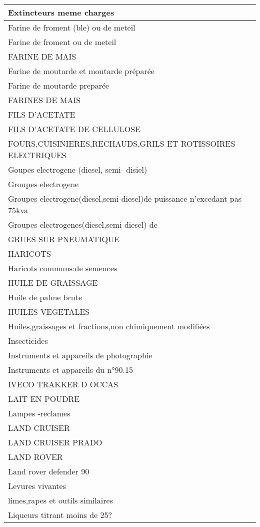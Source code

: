 \documentclass[
]{book}
\begin{document}
\begin{table}
\begin{tabular}[t]{l}
\hline
Extincteurs meme charges\\
\hline
Farine de froment (ble) ou de meteil\\
\hline
Farine de froment ou de meteil\\
\hline
FARINE DE MAIS\\
\hline
Farine de moutarde et moutarde préparée\\
\hline
Farine de moutarde preparée\\
\hline
FARINES DE MAIS\\
\hline
FILS D'ACETATE\\
\hline
FILS D'ACETATE DE CELLULOSE\\
\hline
FOURS,CUISINIERES,RECHAUDS,GRILS ET ROTISSOIRES  ELECTRIQUES\\
\hline
Goupes electrogene (diesel, semi- disiel)\\
\hline
Groupes electrogene\\
\hline
Groupes electrogene(diesel,semi-diesel)de puissance n'excedant pas 75kva\\
\hline
Groupes electrogenes(diesel,semi-diesel) de\\
\hline
GRUES SUR PNEUMATIQUE\\
\hline
HARICOTS\\
\hline
Haricots communs:de semences\\
\hline
HUILE DE GRAISSAGE\\
\hline
Huile de palme brute\\
\hline
HUILES VEGETALES\\
\hline
Huiles,graissages et fractions,non chimiquement modifiées\\
\hline
Insecticides\\
\hline
Instruments et appareils de photographie\\
\hline
Instruments et appareils du n°90.15\\
\hline
IVECO TRAKKER D OCCAS\\
\hline
LAIT EN POUDRE\\
\hline
Lampes -reclames\\
\hline
LAND CRUISER\\
\hline
LAND CRUISER PRADO\\
\hline
LAND ROVER\\
\hline
Land rover defender 90\\
\hline
Levures vivantes\\
\hline
limes,rapes et outils similaires\\
\hline
Liqueurs titrant moins de 25?\\

\end{tabular}
\end{table}
\end{document}
